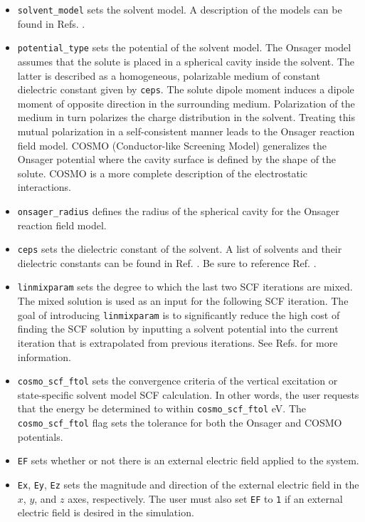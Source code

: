 \documentclass[letterpaper,12pt,titlepage]{article}
\begin{document}
\begin{itemize}
\item \verb+solvent_model+ sets the solvent model.  A description of the models can be found in Refs. \cite{bjorgaard2015solvent1,bjorgaard2015solvent2}.
\item \verb+potential_type+ sets the potential of the solvent model.  The Onsager model assumes that the solute is placed in a spherical cavity inside the solvent. The latter is described as a homogeneous, polarizable medium of constant dielectric constant given by \verb+ceps+. The solute dipole moment induces a dipole moment of opposite direction in the surrounding medium. Polarization of the medium in turn polarizes the charge distribution in the solvent. Treating this mutual polarization in a self-consistent manner leads to the Onsager reaction field model. COSMO (Conductor-like Screening Model) generalizes the Onsager potential where the cavity surface is defined by the shape of the solute.  COSMO is a more complete description of the electrostatic interactions.
\item \verb+onsager_radius+ defines the radius of the spherical cavity for the Onsager reaction field model.  
\item \verb+ceps+ sets the dielectric constant of the solvent.  A list of solvents and their dielectric constants can be found in Ref. \cite{haynes2014crc}.  Be sure to reference Ref. \cite{haynes2014crc}.
\item \verb+linmixparam+ sets the degree to which the last two SCF iterations are mixed.  The mixed solution is used as an input for the following SCF iteration.  The goal of introducing \verb+linmixparam+ is to significantly reduce the high cost of finding the SCF solution by inputting a solvent potential into the current iteration that is extrapolated from previous iterations.  See Refs. \cite{bjorgaard2015solvent1,bjorgaard2015solvent2} for more information.
\item \verb+cosmo_scf_ftol+ sets the convergence criteria of the vertical excitation or state-specific solvent model SCF calculation.  In other words, the user requests that the energy be determined to within \verb+cosmo_scf_ftol+ eV.  The \verb+cosmo_scf_ftol+ flag sets the tolerance for both the Onsager and COSMO potentials.
\item \verb+EF+ sets whether or not there is an external electric field applied to the system.
\item \verb+Ex+, \verb+Ey+, \verb+Ez+ sets the magnitude and direction of the external electric field in the $x$, $y$, and $z$ axes, respectively.  The user must also set \verb+EF+ to \verb+1+ if an external electric field is desired in the simulation.
\end{itemize}
\end{document}
